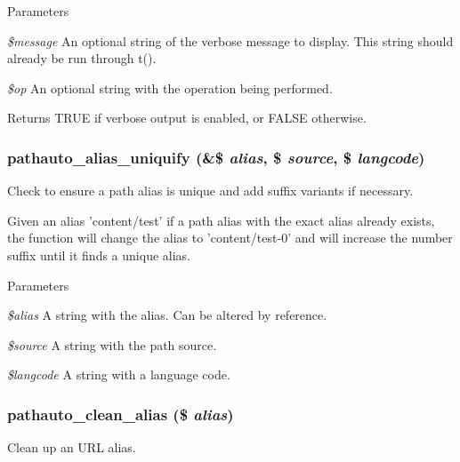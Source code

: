 \begin{DoxyParams}{Parameters}
\item[{\em \$message}]An optional string of the verbose message to display. This string should already be run through t(). \item[{\em \$op}]An optional string with the operation being performed. \end{DoxyParams}
\begin{DoxyReturn}{Returns}
TRUE if verbose output is enabled, or FALSE otherwise. 
\end{DoxyReturn}
\hypertarget{pathauto_8inc_a997f76101702f48dd85c852ca2e91c3b}{
\subsubsection[{pathauto\_\-alias\_\-uniquify}]{\setlength{\rightskip}{0pt plus 5cm}pathauto\_\-alias\_\-uniquify (\&\$ {\em alias}, \/  \$ {\em source}, \/  \$ {\em langcode})}}
\label{pathauto_8inc_a997f76101702f48dd85c852ca2e91c3b}
Check to ensure a path alias is unique and add suffix variants if necessary.

Given an alias 'content/test' if a path alias with the exact alias already exists, the function will change the alias to 'content/test-\/0' and will increase the number suffix until it finds a unique alias.


\begin{DoxyParams}{Parameters}
\item[{\em \$alias}]A string with the alias. Can be altered by reference. \item[{\em \$source}]A string with the path source. \item[{\em \$langcode}]A string with a language code. \end{DoxyParams}
\hypertarget{pathauto_8inc_a4a29b9c383bf47bb94f57e1602f847d9}{
\subsubsection[{pathauto\_\-clean\_\-alias}]{\setlength{\rightskip}{0pt plus 5cm}pathauto\_\-clean\_\-alias (\$ {\em alias})}}
\label{pathauto_8inc_a4a29b9c383bf47bb94f57e1602f847d9}
Clean up an URL alias.


